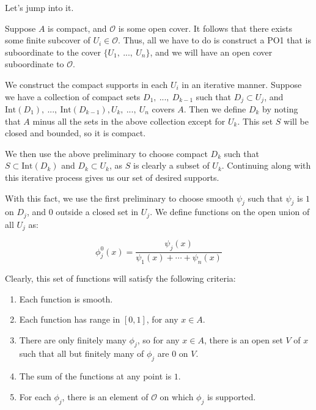 \documentclass[10pt, oneside]{amsart}
\begin{document}
    Let's jump into it.
    \newline

    Suppose $A$ is compact, and $\mathcal{O}$ is some open cover. It follows that there exists some finite subcover of $U_i \in \mathcal{O}$. Thus, all we have to do is construct a PO1 that is suboordinate to the cover $\{U_1, \ ..., \ U_n\}$, and we will have an open cover suboordinate to $\mathcal{O}$.
    \newline

    We construct the compact supports in each $U_i$ in an iterative manner. Suppose we have a collection of compact sets $D_1, \ ..., \ D_{k - 1}$ such
    that $D_j \subset U_j$, and $\text{Int}(D_1), \ ..., \ \text{Int}(D_{k - 1}), U_{k}, \ ..., \ U_n$ covers $A$. Then we define $D_k$
    by noting that $A$ minus all the sets in the above collection except for $U_k$. This set $S$ will be closed and bounded, so it is compact.
    \newline

    We then
    use the above preliminary to choose compact $D_k$ such that $S \subset \text{Int}(D_k)$ and $D_k \subset U_k$, as $S$ is clearly a subset of $U_k$. Continuing along with this iterative process gives us our set of desired supports.

    \hrulefill

    With this fact, we use the first preliminary to choose smooth $\psi_j$ such that $\psi_j$ is $1$ on $D_j$, and $0$ outside a closed set in $U_j$. We define functions on the open union of all $U_j$ as:

    $$\phi_j^{0}(x) = \frac{\psi_j(x)}{\psi_1(x) + \cdots + \psi_n(x)}$$

    Clearly, this set of functions will satisfy the following criteria:

    \begin{enumerate}
    \item Each function is smooth.
    \item Each function has range in $[0, 1]$, for any $x \in A$.
    \item There are only finitely many $\phi_j$, so for any $x \in A$, there is an open set $V$ of $x$ such that all but finitely
      many of $\phi_j$ are $0$ on $V$.
    \item The sum of the functions at any point is $1$.
      \item For each $\phi_j$, there is an element of $\mathcal{O}$ on which $\phi_j$ is supported.
    \end{enumerate}
\end{document}
